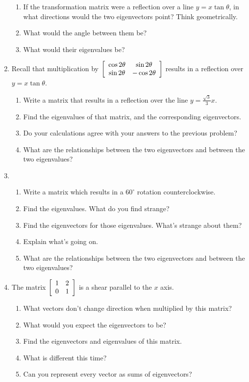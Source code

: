 \documentclass[../textbook.tex]{subfiles}
\begin{document}
\begin{enumerate}
\begin{enumerate}
\item If the transformation matrix were a reflection over a line $y=x\tan\theta$, in what directions would the two eigenvectors point? Think geometrically.
\item What would the angle between them be?
\item What would their eigenvalues be?
\end{enumerate}
\item Recall that multiplication by $\left[\begin{array}{cc} \cos 2\theta & \sin 2\theta \\ \sin 2\theta & -\cos 2\theta \end{array}\right]$ results in a reflection over $y=x\tan \theta$.
\begin{enumerate}
\item Write a matrix that results in a reflection over the line $y=\frac{\sqrt{3}}{3}x.$
\item Find the eigenvalues of that matrix, and the corresponding eigenvectors.
\item Do your calculations agree with your answers to the previous problem?
\item What are the relationships between the two eigenvectors and between the two eigenvalues?
\end{enumerate}
\item \begin{enumerate}
\item Write a matrix which results in a $60^\circ$ rotation counterclockwise.
\item Find the eigenvalues. What do you find strange?
\item Find the eigenvectors for those eigenvalues. What's strange about them?
\item Explain what's going on.
\item What are the relationships between the two eigenvectors and between the two eigenvalues?
\end{enumerate}
\item The matrix $\left[\begin{array}{cc} 1 & 2 \\ 0 & 1 \end{array}\right]$ is a shear parallel to the $x$ axis.
\begin{enumerate}
\item What vectors don't change direction when multiplied by this matrix?
\item What would you expect the eigenvectors to be?
\item Find the eigenvectors and eigenvalues of this matrix.
\item What is different this time?
\item Can you represent every vector as sums of eigenvectors?
\end{enumerate}

\end{enumerate}
\end{document}
